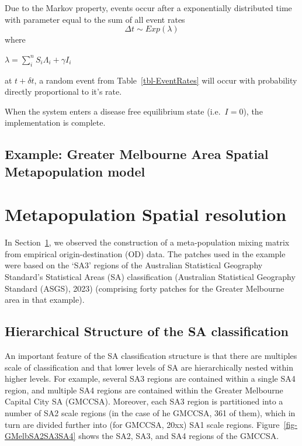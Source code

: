 \documentclass[
  letterpaper,
  DIV=11,
  numbers=noendperiod]{scrreprt}
\begin{document}
Due to the Markov property, events occur after a exponentially
distributed time with parameter equal to the sum of all event rates
\[\Delta t \sim Exp(\lambda)\] where

\(\lambda = \sum\limits_{i}^{n}S_i \Lambda_i + \gamma I_i\)

at \(t + \delta t\), a random event from Table~\ref{tbl-EventRates} will
occur with probability directly proportional to it's rate.

When the system enters a disease free equilibrium state
(i.e.~\(I = 0\)), the implementation is complete.

\hypertarget{sec-MossGmelb}{%
\section{Example: Greater Melbourne Area Spatial Metapopulation
model}\label{sec-MossGmelb}}


\hypertarget{sec-intro}{%
\chapter{Metapopulation Spatial resolution}\label{sec-intro}}

In Section~\ref{sec-MossGmelb}, we observed the construction of a
meta-population mixing matrix from empirical origin-destination (OD)
data. The patches used in the example were based on the `SA3' regions of
the Australian Statistical Geography Standard's Statistical Areas (SA)
classification (Australian Statistical Geography Standard (ASGS), 2023)
(comprising forty patches for the Greater Melbourne area in that
example).

\hypertarget{hierarchical-structure-of-the-sa-classification}{%
\section{Hierarchical Structure of the SA
classification}\label{hierarchical-structure-of-the-sa-classification}}

An important feature of the SA classification structure is that there
are multiples scale of classification and that lower levels of SA are
hierarchically nested within higher levels. For example, several SA3
regions are contained within a single SA4 region, and multiple SA4
regions are contained within the Greater Melbourne Capital City SA
(GMCCSA). Moreover, each SA3 region is partitioned into a number of SA2
scale regions (in the case of he GMCCSA, 361 of them), which in turn are
divided further into (for GMCCSA, 20xx) SA1 scale regions.
Figure~\ref{fig-GMelbSA2SA3SA4} shows the SA2, SA3, and SA4 regions of
the GMCCSA.
\end{document}
